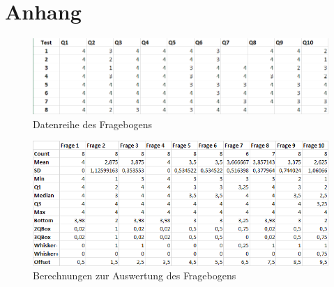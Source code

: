 \chapter{Anhang}
\label{appedixa}
\begin{figure}[h]
	\centering
		\includegraphics[width=1.00\textwidth]{media/tableData.png}
	\caption{Datenreihe des Fragebogens}
	\label{fig:tableData}
\end{figure}

\begin{figure}[h]
	\centering
		\includegraphics[width=1.00\textwidth]{media/excel_calculation.png}
	\caption{Berechnungen zur Auswertung des Fragebogens}
	\label{fig:excel_calculation}
\end{figure}


\clearpage




